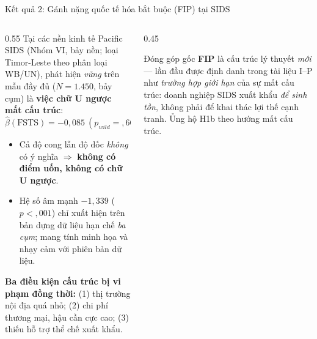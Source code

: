 \documentclass[aspectratio=169,11pt]{beamer}
\newcommand{\hl}[1]{\textcolor{accent2}{\textbf{#1}}}
\newcommand{\kw}[1]{\textcolor{accent}{\textbf{#1}}}
\begin{document}
\begin{frame}{Kết quả 2: Gánh nặng quốc tế hóa bắt buộc (FIP) tại SIDS}
  \begin{columns}[T]
    \begin{column}{0.55\textwidth}\small
    Tại các nền kinh tế Pacific SIDS (Nhóm VI, bảy nền; loại Timor-Leste theo phân loại WB/UN), phát hiện \emph{vững} trên mẫu đầy đủ ($N=1.450$, bảy cụm) là \hl{việc chữ U ngược mất cấu trúc}:
    \[ \hat\beta(\text{FSTS})=-0{,}085\ (p_{wild}={,}66);\ \ \hat\beta(\text{FSTS}^2)=+0{,}696\ (p_{wild}={,}082) \]
    \begin{itemize}
      \item Cả độ cong lẫn độ dốc \emph{không} có ý nghĩa $\Rightarrow$ \hl{không có điểm uốn, không có chữ U ngược}.
      \item Hệ số âm mạnh $-1{,}339$ ($p<{,}001$) chỉ xuất hiện trên bản dựng dữ liệu hạn chế \emph{ba cụm}; mang tính minh họa và nhạy cảm với phiên bản dữ liệu.
    \end{itemize}
    \kw{Ba điều kiện cấu trúc bị vi phạm đồng thời:}
    (1) thị trường nội địa quá nhỏ; (2) chi phí thương mại, hậu cần cực cao; (3) thiếu hỗ trợ thể chế xuất khẩu.
    \end{column}
    \begin{column}{0.45\textwidth}
    \begin{block}{Đóng góp gốc}
    \small \hl{FIP} là cấu trúc lý thuyết \emph{mới} --- lần đầu được định danh trong tài liệu I--P như \emph{trường hợp giới hạn} của sự mất cấu trúc: doanh nghiệp SIDS xuất khẩu \emph{để sinh tồn}, không phải để khai thác lợi thế cạnh tranh. Ủng hộ H1b theo hướng mất cấu trúc.
    \end{block}
    \centering
    \end{column}
  \end{columns}
\end{frame}

\end{document}
